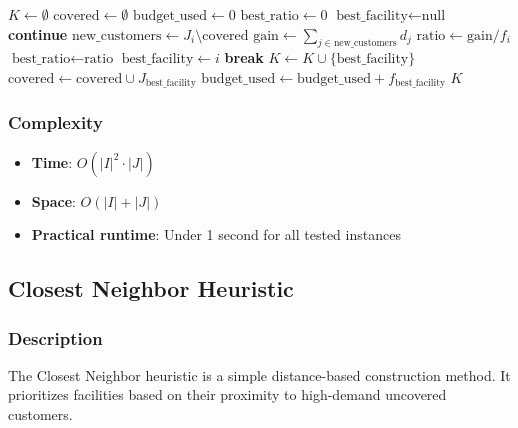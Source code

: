 \documentclass[11pt,a4paper]{article}
\begin{document}
\begin{algorithm}[H]
\caption{Greedy MCLP Heuristic}
\begin{algorithmic}[1]
\State $K \gets \emptyset$ 
\State $\text{covered} \gets \emptyset$ 
\State $\text{budget\_used} \gets 0$
  \State $\text{best\_ratio} \gets 0$
  \State $\text{best\_facility} \gets \text{null}$
      \State \textbf{continue}
    \EndIf
    \State $\text{new\_customers} \gets J_i \setminus \text{covered}$
    \State $\text{gain} \gets \sum_{j \in \text{new\_customers}} d_j$
    \State $\text{ratio} \gets \text{gain} / f_i$
      \State $\text{best\_ratio} \gets \text{ratio}$
      \State $\text{best\_facility} \gets i$
    \EndIf
  \EndFor
    \State \textbf{break}
  \EndIf
  \State $K \gets K \cup \{\text{best\_facility}\}$
  \State $\text{covered} \gets \text{covered} \cup J_{\text{best\_facility}}$
  \State $\text{budget\_used} \gets \text{budget\_used} + f_{\text{best\_facility}}$
\EndWhile
\State \Return $K$
\end{algorithmic}
\end{algorithm}

\subsubsection{Complexity}
\begin{itemize}
  \item \textbf{Time}: $O(|I|^2 \cdot |J|)$
  \item \textbf{Space}: $O(|I| + |J|)$
  \item \textbf{Practical runtime}: Under 1 second for all tested instances
\end{itemize}

\subsection{Closest Neighbor Heuristic}

\subsubsection{Description}

The Closest Neighbor heuristic is a simple distance-based construction method. It prioritizes facilities based on their proximity to high-demand uncovered customers.
\end{document}
